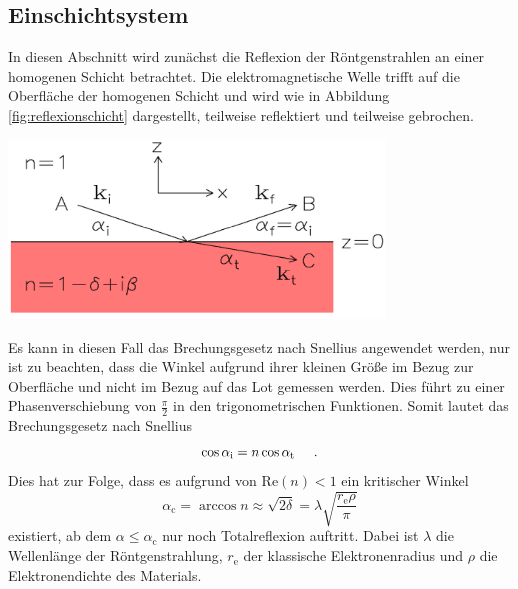 \documentclass[captions=tableheading]{scrartcl}
\newcommand{\indx}[1]{\text{#1}}
\newcommand{\RE}[1]{\mathrm{Re} \left(#1 \right)}
\begin{document}
\subsection{Einschichtsystem}
In diesen Abschnitt wird zunächst die Reflexion der Röntgenstrahlen an einer homogenen Schicht betrachtet.
Die elektromagnetische Welle trifft auf die Oberfläche der homogenen Schicht und wird wie in Abbildung \ref{fig:reflexionschicht} dargestellt, teilweise reflektiert und teilweise gebrochen.
\begin{center}
	\includegraphics[width=10cm]{images/reflexionschicht.png}
	\label{fig:reflexionschicht}
\end{center}
Es kann in diesen Fall das Brechungsgesetz nach Snellius angewendet werden, nur ist zu beachten, dass die Winkel aufgrund ihrer kleinen Größe im Bezug zur Oberfläche und nicht im Bezug auf das Lot gemessen werden. 
Dies führt zu einer Phasenverschiebung von $\frac{\pi}{2}$ in den trigonometrischen Funktionen.
Somit lautet das Brechungsgesetz nach Snellius
\begin{equation}
\cos \alpha_{\indx{i}}=n\cos \alpha_{\indx{t}} \hspace{0.5cm}\text{.}
\end{equation}
Dies hat zur Folge, dass es aufgrund von $\RE{n}<1 $ ein kritischer Winkel
\begin{equation}
\alpha_{\indx{c}}=\arccos n \approx \sqrt{2\delta } = \lambda \sqrt{\frac{r_{\indx{e}} \rho}{\pi}}
\label{eq:elektronendichte}
\end{equation}
existiert, ab dem $\alpha \le \alpha_{\indx{c}}$ nur noch Totalreflexion auftritt.
Dabei ist $\lambda$ die Wellenlänge der Röntgenstrahlung, $r_{\indx{e}}$ der klassische Elektronenradius und $\rho$ die Elektronendichte des Materials. 
\end{document}
